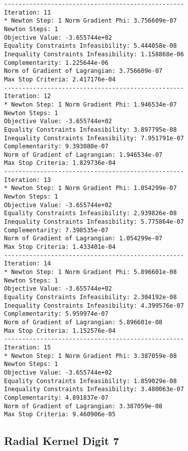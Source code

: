 \documentclass{article}
\begin{document}
\scriptsize
\begin{minipage}[t]{0.45\textwidth}
\begin{verbatim}
--------------------------------------------------
Iteration: 11
* Newton Step: 1 Norm Gradient Phi: 3.756609e-07
Newton Steps: 1
Objective Value: -3.655744e+02
Equality Constraints Infeasibility: 5.444058e-08
Inequality Constraints Infeasibility: 1.158868e-06
Complementarity: 1.225644e-06
Norm of Gradient of Lagrangian: 3.756609e-07
Max Stop Criteria: 2.417176e-04
--------------------------------------------------
Iteration: 12
* Newton Step: 1 Norm Gradient Phi: 1.946534e-07
Newton Steps: 1
Objective Value: -3.655744e+02
Equality Constraints Infeasibility: 3.897795e-08
Inequality Constraints Infeasibility: 7.951791e-07
Complementarity: 9.393080e-07
Norm of Gradient of Lagrangian: 1.946534e-07
Max Stop Criteria: 1.829736e-04
--------------------------------------------------
Iteration: 13
* Newton Step: 1 Norm Gradient Phi: 1.054299e-07
Newton Steps: 1
Objective Value: -3.655744e+02
Equality Constraints Infeasibility: 2.939826e-08
Inequality Constraints Infeasibility: 5.775864e-07
Complementarity: 7.398535e-07
Norm of Gradient of Lagrangian: 1.054299e-07
Max Stop Criteria: 1.433401e-04
--------------------------------------------------
Iteration: 14
* Newton Step: 1 Norm Gradient Phi: 5.896601e-08
Newton Steps: 1
Objective Value: -3.655744e+02
Equality Constraints Infeasibility: 2.304192e-08
Inequality Constraints Infeasibility: 4.399576e-07
Complementarity: 5.959974e-07
Norm of Gradient of Lagrangian: 5.896601e-08
Max Stop Criteria: 1.152576e-04
--------------------------------------------------
Iteration: 15
* Newton Step: 1 Norm Gradient Phi: 3.387059e-08
Newton Steps: 1
Objective Value: -3.655744e+02
Equality Constraints Infeasibility: 1.859029e-08
Inequality Constraints Infeasibility: 3.480063e-07
Complementarity: 4.891837e-07
Norm of Gradient of Lagrangian: 3.387059e-08
Max Stop Criteria: 9.460906e-05
\end{verbatim}
\end{minipage}

\subsection{Radial Kernel Digit 7}\label{radial7}
\end{document}
